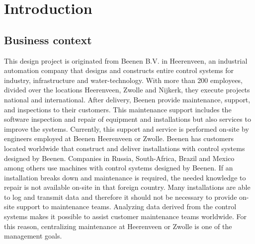 
\chapter{Introduction} %

\label{Chapter1} %


\newcommand{\keyword}[1]{\textbf{#1}}
\newcommand{\tabhead}[1]{\textbf{#1}}
\newcommand{\code}[1]{\texttt{#1}}
\newcommand{\file}[1]{\texttt{\bfseries#1}}
\newcommand{\option}[1]{\texttt{\itshape#1}}


\section{Business context} \label{Business context}
This design project is originated from Beenen B.V. in Heerenveen, an industrial automation company that designs and constructs entire control systems for industry, infrastructure and water-technology. With more than 200 employees, divided over the locations Heerenveen, Zwolle and Nijkerk, they execute projects national and international. After delivery, Beenen provide maintenance, support, and inspections to their customers. This maintenance support includes the software inspection and repair of equipment and installations but also services to improve the systems. Currently, this support and service is performed on-site by engineers employed at Beenen Heerenveen or Zwolle. Beenen has customers located worldwide that construct and deliver installations with control systems designed by Beenen. Companies in Russia, South-Africa, Brazil and Mexico among others use machines with control systems designed by Beenen. If an installation breaks down and maintenance is required, the needed knowledge to repair is not available on-site in that foreign country. Many installations are able to log and transmit data and therefore it should not be necessary to provide on-site support to maintenance teams. Analyzing data derived from the control systems makes it possible to assist customer maintenance teams worldwide. For this reason, centralizing maintenance at Heerenveen or Zwolle is one of the management goals.

